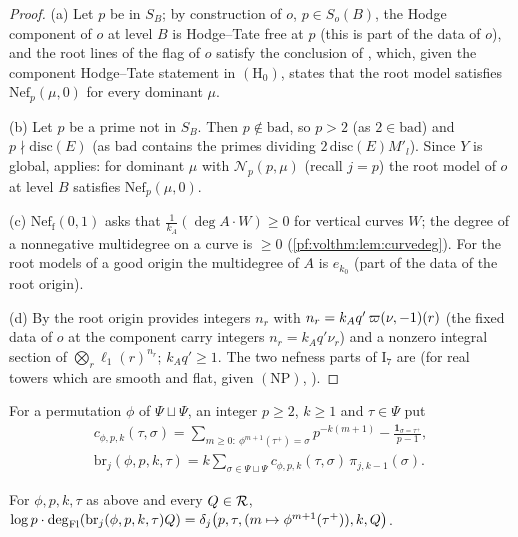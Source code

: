 \begin{proof}
(a) Let $p$ be in $S_B$; by construction of $o$, $p\in S_o(B)$, the Hodge component of $o$ at level $B$ is
Hodge--Tate free at $p$ (this is part of the data of $o$), and the root lines of the flag of $o$ satisfy the conclusion of
, which, given the component
Hodge--Tate statement in $(\mathrm{H}_0)$, states that the root model satisfies $\mathrm{Nef}_p(\mu,0)$ for every
dominant $\mu$.

(b) Let $p$ be a prime not in $S_B$. Then $p\notin\mathrm{bad}$, so $p>2$ (as $2\in\mathrm{bad}$) and
$p\nmid\mathrm{disc}(E)$ (as $\mathrm{bad}$ contains the primes dividing $2\,\mathrm{disc}(E)M'_l$). Since $Y$ is global,
 applies: for dominant $\mu$ with $\mathcal N_p(p,\mu)$ (recall
$j=p$) the root model of $o$ at level $B$ satisfies $\mathrm{Nef}_p(\mu,0)$.

(c) $\mathrm{Nef}_{\mathrm f}(0,1)$ asks that $\frac1{k_A}(\deg A\cdot W)\ge0$ for vertical curves $W$; the degree
of a nonnegative multidegree on a curve is $\ge0$ (\cref{pf:volthm:lem:curvedeg}). For the root
models of a good origin the multidegree of $A$ is $e_{k_0}$ (part of the data of the root origin).

(d) By  the root origin provides integers $n_r$ with
$n_r=k_Aq'\,\varpi(\nu,-1)(r)$ (the fixed data of $o$ at the component carry integers $n_r=k_Aq'\nu_r$) and a nonzero
integral section of $\bigotimes_r\ell_1(r)^{n_r}$; $k_Aq'\ge1$. The two nefness parts of $\mathrm{I}_7$ are
 (for real towers which are smooth and flat, given
$(\mathrm{NP})$, ).
\end{proof}

For a permutation $\phi$ of $\Psi\sqcup\Psi$, an integer $p\ge2$, $k\ge1$ and $\tau\in\Psi$ put
\begin{gather*}
c_{\phi,p,k}(\tau,\sigma)=\sum_{m\ge0:\ \phi^{m+1}(\tau^+)=\sigma}p^{-k(m+1)}-\frac{\mathbf 1_{\sigma=\tau^+}}{p-1},\\
\mathrm{br}_j(\phi,p,k,\tau)=k\sum_{\sigma\in\Psi\sqcup\Psi}c_{\phi,p,k}(\tau,\sigma)\,\pi_{j,k-1}(\sigma).
\end{gather*}

\begin{lemma}\label{pf:volthm:lem:bracket}
For $\phi,p,k,\tau$ as above and every $Q\in\mathcal{R}$,
$\log p\cdot\deg_{\mathrm{Fl}}(\mathrm{br}_j(\phi,p,k,\tau)Q)=\delta_j\bigl(p,\tau,(m\mapsto\phi^{m+1}(\tau^+)),k,Q\bigr)$.
\end{lemma}


